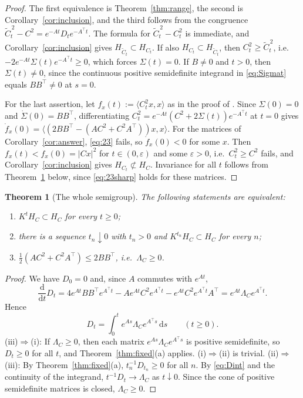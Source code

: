 \documentclass[11pt]{amsart}
\numberwithin{equation}{section}
\newtheorem{theorem}{Theorem}[section]
\theoremstyle{definition}
\theoremstyle{remark}
\newcommand{\dd}{\,\mathrm{d}}
\newcommand{\Ct}{\widetilde{C}_t}
\newcommand{\ip}[2]{\langle #1,#2\rangle}
\newcommand{\tp}{\top}
\begin{document}
\begin{proof}
The first equivalence is Theorem~\ref{thm:range}, the second is Corollary~\ref{cor:inclusion}, and the third follows
from the congruence $\Ct^{\,2}-C^2=e^{-At}D_te^{-A^\tp t}$. The formula for $\Ct^{\,2}-C_t^2$ is immediate, and
Corollary~\ref{cor:inclusion} gives $H_{\Ct}\subset H_{C_t}$. If also $H_{C_t}\subset H_{\Ct}$, then $C_t^2\ge\Ct^{\,2}$,
i.e.\ $-2e^{-At}\Sigma(t)e^{-A^\tp t}\ge0$, which forces $\Sigma(t)=0$. If $B\neq0$ and $t>0$, then $\Sigma(t)\ne0$, since
the continuous positive semidefinite integrand in \eqref{eq:Sigmat} equals $BB^\tp\ne0$ at $s=0$.

For the last assertion, let $f_x(t):=\ip{C_t^2x}x$ as in the proof of \cite[Theorem~2.1]{PSWPN}. Since $\Sigma(0)=0$
and $\dot\Sigma(0)=BB^\tp$, differentiating $C_t^2=e^{-At}(C^2+2\Sigma(t))e^{-A^\tp t}$ at $t=0$ gives
$\dot f_x(0)=\ip{(2BB^\tp-(AC^2+C^2A^\tp))x}x$. For the matrices of Corollary~\ref{cor:answer}, \eqref{eq:23} fails, so
$\dot f_x(0)<0$ for some $x$. Then $f_x(t)<f_x(0)=|Cx|^2$ for $t\in(0,\varepsilon)$ and some $\varepsilon>0$, i.e.\
$C_t^2\ge C^2$ fails, and Corollary~\ref{cor:inclusion} gives $H_{C_t}\not\subset H_C$. Invariance for all $t$ follows
from Theorem~\ref{thm:semigroup} below, since \eqref{eq:23sharp} holds for these matrices.
\end{proof}

\begin{theorem}[The whole semigroup]\label{thm:semigroup}
The following statements are equivalent:
\begin{enumerate}
\item[(i)] $K^tH_C\subset H_C$ for every $t\ge0$;
\item[(ii)] there is a sequence $t_n\downarrow0$ with $t_n>0$ and $K^{t_n}H_C\subset H_C$ for every $n$;
\item[(iii)] $\tfrac12(AC^2+C^2A^\tp)\le2BB^\tp$, i.e.\ $\Lambda_C\ge0$.
\end{enumerate}
\end{theorem}

\begin{proof}
We have $D_0=0$ and, since $A$ commutes with $e^{At}$,
\[
\frac{\mathrm d}{\mathrm dt}D_t=4e^{At}BB^\tp e^{A^\tp t}-Ae^{At}C^2e^{A^\tp t}-e^{At}C^2e^{A^\tp t}A^\tp=e^{At}\Lambda_Ce^{A^\tp t}.
\]
Hence
\begin{equation}\label{eq:Dint}
D_t=\int_0^te^{As}\Lambda_Ce^{A^\tp s}\dd s\qquad(t\ge0).
\end{equation}
(iii)$\Rightarrow$(i): If $\Lambda_C\ge0$, then each matrix $e^{As}\Lambda_Ce^{A^\tp s}$ is positive semidefinite, so
$D_t\ge0$ for all $t$, and Theorem~\ref{thm:fixed}(a) applies. (i)$\Rightarrow$(ii) is trivial.
(ii)$\Rightarrow$(iii): By Theorem~\ref{thm:fixed}(a), $t_n^{-1}D_{t_n}\ge0$ for all $n$. By \eqref{eq:Dint} and the
continuity of the integrand, $t^{-1}D_t\to\Lambda_C$ as $t\downarrow0$. Since the cone of positive semidefinite matrices
is closed, $\Lambda_C\ge0$.
\end{proof}
\end{document}
